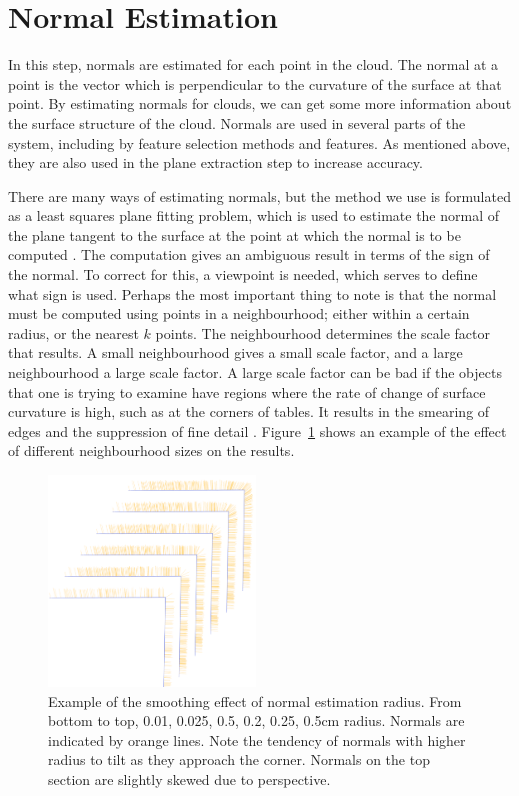 \documentclass[11pt,a4paper]{kth-mag}
\begin{document}
\section{Normal Estimation}
In this step, normals are estimated for each point in the cloud. The normal at a
point is the vector which is perpendicular to the curvature of the surface at
that point. By estimating normals for clouds, we can get some more information
about the surface structure of the cloud. Normals are used in several parts of
the system, including by feature selection methods and features. As mentioned
above, they are also used in the plane extraction step to increase accuracy.

There are many ways of estimating normals, but the method we use is formulated
as a least squares plane fitting problem, which is used to estimate the normal
of the plane tangent to the surface at the point at which the normal is to be
computed \cite{RusuDoctoralDissertation}. The computation gives an ambiguous
result in terms of the sign of the normal. To correct for this, a viewpoint is
needed, which serves to define what sign is used. Perhaps the most important
thing to note is that the normal must be computed using points in a
neighbourhood; either within a certain radius, or the nearest $k$ points. The
neighbourhood determines the scale factor that results. A small neighbourhood
gives a small scale factor, and a large neighbourhood a large scale factor. A
large scale factor can be bad if the objects that one is trying to examine have
regions where the rate of change of surface curvature is high, such as at the
corners of tables. It results in the smearing of edges and the suppression of
fine detail \cite{RusuDoctoralDissertation}. Figure~\ref{fig:normal_corner}
shows an example of the effect of different neighbourhood sizes on the results.

\begin{figure}
  \centering
  \includegraphics[width=0.49\textwidth]{images/normals_comb}
  \caption{Example of the smoothing effect of normal estimation radius. From
    bottom to top, 0.01, 0.025, 0.5, 0.2, 0.25, 0.5cm radius. Normals are
    indicated by orange lines. Note the tendency of normals with higher radius
    to tilt as they approach the corner. Normals on the top section are slightly
    skewed due to perspective.}
  \label{fig:normal_corner}
\end{figure}
\end{document}
